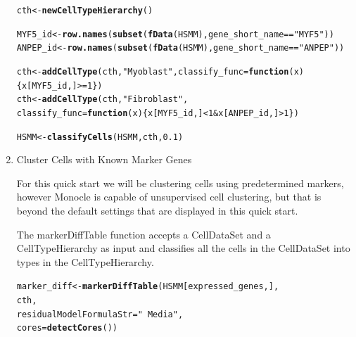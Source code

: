 \documentclass[10pt,oneside]{article}\usepackage[]{graphicx}\usepackage[]{color}
\makeatletter
\newcommand{\hlnum}[1]{\textcolor[rgb]{0.686,0.059,0.569}{#1}}%
\newcommand{\hlstr}[1]{\textcolor[rgb]{0.192,0.494,0.8}{#1}}%
\newcommand{\hlopt}[1]{\textcolor[rgb]{0,0,0}{#1}}%
\newcommand{\hlstd}[1]{\textcolor[rgb]{0.345,0.345,0.345}{#1}}%
\newcommand{\hlkwa}[1]{\textcolor[rgb]{0.161,0.373,0.58}{\textbf{#1}}}%
\newcommand{\hlkwb}[1]{\textcolor[rgb]{0.69,0.353,0.396}{#1}}%
\newcommand{\hlkwc}[1]{\textcolor[rgb]{0.333,0.667,0.333}{#1}}%
\newcommand{\hlkwd}[1]{\textcolor[rgb]{0.737,0.353,0.396}{\textbf{#1}}}%
\newenvironment{kframe}{%
 \def\at@end@of@kframe{}%
 \ifinner\ifhmode%
  \def\at@end@of@kframe{\end{minipage}}%
  \begin{minipage}{\columnwidth}%
 \fi\fi%
 \def\FrameCommand##1{\hskip\@totalleftmargin \hskip-\fboxsep
 \colorbox{shadecolor}{##1}\hskip-\fboxsep
     \hskip-\linewidth \hskip-\@totalleftmargin \hskip\columnwidth}%
 \MakeFramed {\advance\hsize-\width
   \@totalleftmargin\z@ \linewidth\hsize
   \@setminipage}}%
 {\par\unskip\endMakeFramed%
 \at@end@of@kframe}
\newenvironment{knitrout}{}{} %
\makeatother
\begin{document}
\begin{enumerate}
\begin{knitrout}
\color{fgcolor}\begin{kframe}
\begin{alltt}
\hlstd{cth} \hlkwb{<-} \hlkwd{newCellTypeHierarchy}\hlstd{()}

\hlstd{MYF5_id} \hlkwb{<-} \hlkwd{row.names}\hlstd{(}\hlkwd{subset}\hlstd{(}\hlkwd{fData}\hlstd{(HSMM), gene_short_name} \hlopt{==} \hlstr{"MYF5"}\hlstd{))}
\hlstd{ANPEP_id} \hlkwb{<-} \hlkwd{row.names}\hlstd{(}\hlkwd{subset}\hlstd{(}\hlkwd{fData}\hlstd{(HSMM), gene_short_name} \hlopt{==} \hlstr{"ANPEP"}\hlstd{))}

\hlstd{cth} \hlkwb{<-} \hlkwd{addCellType}\hlstd{(cth,} \hlstr{"Myoblast"}\hlstd{,} \hlkwc{classify_func} \hlstd{=} \hlkwa{function}\hlstd{(}\hlkwc{x}\hlstd{) \{x[MYF5_id,]} \hlopt{>=} \hlnum{1}\hlstd{\})}
\hlstd{cth} \hlkwb{<-} \hlkwd{addCellType}\hlstd{(cth,} \hlstr{"Fibroblast"}\hlstd{,}
                   \hlkwc{classify_func} \hlstd{=} \hlkwa{function}\hlstd{(}\hlkwc{x}\hlstd{) \{x[MYF5_id,]} \hlopt{<} \hlnum{1} \hlopt{&} \hlstd{x[ANPEP_id,]} \hlopt{>} \hlnum{1}\hlstd{\} )}

\hlstd{HSMM} \hlkwb{<-} \hlkwd{classifyCells}\hlstd{(HSMM, cth,} \hlnum{0.1}\hlstd{)}
\end{alltt}
\end{kframe}
\end{knitrout}
 
 \item Cluster Cells with Known Marker Genes
 
 For this quick start we will be clustering cells using predetermined markers, however Monocle is capable of unsupervised cell clustering, but that is beyond the default settings that are displayed in this quick start.
 
 The markerDiffTable function accepts a CellDataSet and a CellTypeHierarchy as input and classifies all the cells in the CellDataSet into types in the CellTypeHierarchy.
\begin{knitrout}
\color{fgcolor}\begin{kframe}
\begin{alltt}
\hlstd{marker_diff} \hlkwb{<-} \hlkwd{markerDiffTable}\hlstd{(HSMM[expressed_genes,],}
                               \hlstd{cth,}
                               \hlkwc{residualModelFormulaStr} \hlstd{=} \hlstr{"~Media"}\hlstd{,}
                               \hlkwc{cores} \hlstd{=} \hlkwd{detectCores}\hlstd{())}
\end{alltt}
\end{kframe}
\end{knitrout}
 

\end{enumerate}
\end{document}
